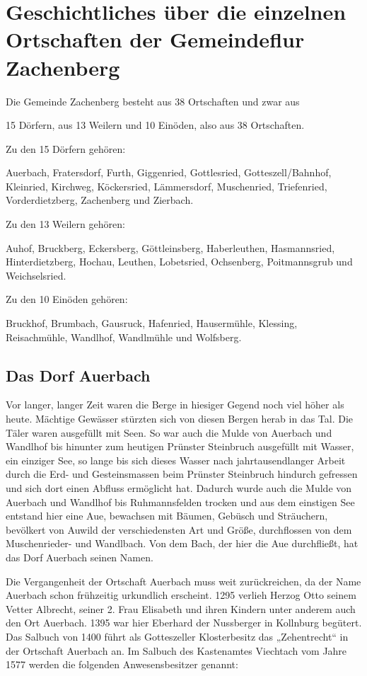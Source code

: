 \documentclass[12pt,a4pager]{book}
\begin{document}
\chapter{Geschichtliches über die einzelnen Ortschaften der Gemeindeflur Zachenberg}

Die Gemeinde Zachenberg besteht aus 38 Ortschaften und zwar aus

15 Dörfern, aus 13 Weilern und 10 Einöden, also aus 38 Ortschaften.

Zu den 15 Dörfern gehören:

Auerbach, Fratersdorf, Furth, Giggenried, Gottlesried, Gotteszell/Bahnhof,
Kleinried, Kirchweg, Köckersried, Lämmersdorf, Muschenried, Triefenried,
Vorderdietzberg, Zachenberg und Zierbach.

Zu den 13 Weilern gehören:

Auhof, Bruckberg, Eckersberg, Göttleinsberg, Haberleuthen, Hasmannsried,
Hinterdietzberg, Hochau, Leuthen, Lobetsried, Ochsenberg, Poitmannsgrub und
Weichselsried.

Zu den 10 Einöden gehören:

Bruckhof, Brumbach, Gausruck, Hafenried, Hausermühle, Klessing, Reisachmühle,
Wandlhof, Wandlmühle und Wolfsberg.

\section{Das Dorf Auerbach}

Vor langer, langer Zeit waren die Berge in hiesiger Gegend noch viel höher als
heute. Mächtige Gewässer stürzten sich von diesen Bergen herab in das Tal. Die
Täler waren ausgefüllt mit Seen. So war auch die Mulde von Auerbach und Wandlhof
bis hinunter zum heutigen Prünster Steinbruch ausgefüllt mit Wasser, ein
einziger See, so lange bis sich dieses Wasser nach jahrtausendlanger Arbeit
durch die Erd- und Gesteinsmassen beim Prünster Steinbruch hindurch gefressen
und sich dort einen Abfluss ermöglicht hat. Dadurch wurde auch die Mulde von
Auerbach und Wandlhof bis Ruhmannsfelden trocken und aus dem einstigen See
entstand hier eine Aue, bewachsen mit Bäumen, Gebüsch und Sträuchern, bevölkert
von Auwild der verschiedensten Art und Größe, durchflossen von dem
Muschenrieder- und Wandlbach. Von dem Bach, der hier die Aue durchfließt, hat
das Dorf Auerbach seinen Namen.

Die Vergangenheit der Ortschaft Auerbach muss weit zurückreichen, da der Name
Auerbach schon frühzeitig urkundlich erscheint. 1295 verlieh Herzog Otto seinem
Vetter Albrecht, seiner 2. Frau Elisabeth und ihren Kindern unter anderem auch
den Ort Auerbach. 1395 war hier Eberhard der Nussberger in Kollnburg begütert.
Das Salbuch von 1400 führt als Gotteszeller Klosterbesitz das „Zehentrecht“ in
der Ortschaft Auerbach an. Im Salbuch des Kastenamtes Viechtach vom Jahre 1577
werden die folgenden Anwesensbesitzer genannt:
\end{document}

